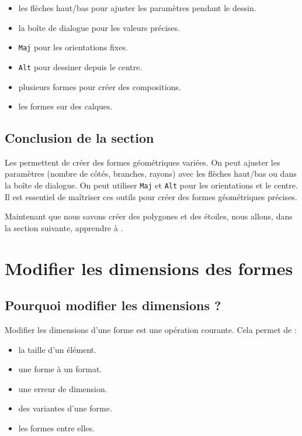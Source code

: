 \begin{itemize}
    \item {} les flèches haut/bas pour ajuster les paramètres pendant le dessin.
    \item {} la boîte de dialogue pour les valeurs précises.
    \item {} \texttt{Maj} pour les orientations fixes.
    \item {} \texttt{Alt} pour dessiner depuis le centre.
    \item {} plusieurs formes pour créer des compositions.
    \item {} les formes sur des calques.
\end{itemize}

\subsection*{Conclusion de la section}

Les  permettent de créer des formes géométriques variées. On peut ajuster les paramètres (nombre de côtés, branches, rayons) avec les flèches haut/bas ou dans la boîte de dialogue. On peut utiliser \texttt{Maj} et \texttt{Alt} pour les orientations et le centre. Il est essentiel de maîtriser ces outils pour créer des formes géométriques précises.

Maintenant que nous savons créer des polygones et des étoiles, nous allons, dans la section suivante, apprendre à .

\section{Modifier les dimensions des formes}

\subsection{Pourquoi modifier les dimensions ?}

Modifier les dimensions d'une forme est une opération courante. Cela permet de :

\begin{itemize}
    \item {} la taille d'un élément.
    \item {} une forme à un format.
    \item {} une erreur de dimension.
    \item {} des variantes d'une forme.
    \item {} les formes entre elles.
\end{itemize}


